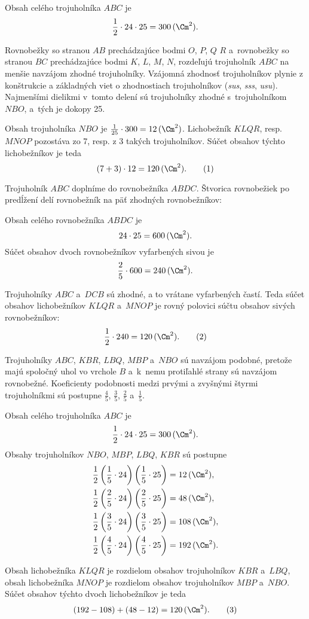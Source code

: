 {%
Obsah celého trojuholníka $ABC$ je
$$
\frac12\cdot24\cdot 25=300\,(\Cm^2).
$$

Rovnobežky so stranou $AB$ prechádzajúce bodmi $O$, $P$, $Q$ $R$ a~rovnobežky so stranou $BC$ prechádzajúce bodmi $K$, $L$, $M$, $N$, rozdeľujú trojuholník $ABC$ na menšie navzájom zhodné trojuholníky.
Vzájomná zhodnosť trojuholníkov plynie z konštrukcie a základných viet o zhodnostiach trojuholníkov ({\it sus\/}, {\it sss\/}, {\it usu\/}).
Najmenšími dielikmi v~tomto delení sú trojuholníky zhodné s~trojuholníkom $NBO$, a~tých je dokopy 25.
%

Obsah trojuholníka $NBO$ je $\frac1{25}\cdot300=12\,(\Cm^2)$.
Lichobežník $KLQR$, resp. $MNOP$ pozostáva zo 7, resp. z 3 takých trojuholníkov.
Súčet obsahov týchto lichobežníkov je teda
$$
(7+3)\cdot12 =120\,(\Cm^2) .  \tag{1}
$$

\ineriesenie
Trojuholník $ABC$ doplníme do rovnobežníka $ABDC$.
Štvorica rovnobežiek po predĺžení delí rovnobežník na päť zhodných rovnobežníkov:
%

Obsah celého rovnobežníka $ABDC$ je
$$
24\cdot25=600\,(\Cm^2).
$$
Súčet obsahov dvoch rovnobežníkov vyfarbených sivou je
$$
\frac25\cdot600 =240\,(\Cm^2).
$$

Trojuholníky $ABC$ a~$DCB$ sú zhodné, a to vrátane vyfarbených častí.
Teda súčet obsahov lichobežníkov $KLQR$ a~$MNOP$ je rovný polovici súčtu obsahov sivých rovnobežníkov:
$$
\frac12\cdot240 =120\,(\Cm^2) .  \tag{2}
$$

\ineriesenie
Trojuholníky $ABC$, $KBR$, $LBQ$, $MBP$ a~$NBO$ sú navzájom podobné, pretože majú spoločný uhol vo vrchole $B$ a~k~nemu protiľahlé strany sú navzájom rovnobežné.
Koeficienty podobnosti medzi prvými a zvyšnými štyrmi trojuholníkmi sú postupne $\frac45$, $\frac35$, $\frac25$ a~$\frac15$.
%

Obsah celého trojuholníka $ABC$ je
$$
\frac12\cdot24\cdot 25=300\,(\Cm^2).
$$
Obsahy trojuholníkov $NBO$, $MBP$, $LBQ$, $KBR$ sú postupne
$$\aligned
&\frac12\left(\frac15\cdot24\right)\left(\frac15\cdot25\right) =12\,(\Cm^2) , \\
&\frac12\left(\frac25\cdot24\right)\left(\frac25\cdot25\right) =48\,(\Cm^2) , \\
&\frac12\left(\frac35\cdot24\right)\left(\frac35\cdot25\right) =108\,(\Cm^2) , \\
&\frac12\left(\frac45\cdot24\right)\left(\frac45\cdot25\right) =192\,(\Cm^2) .
\endaligned
$$

Obsah lichobežníka $KLQR$ je rozdielom obsahov trojuholníkov $KBR$ a~$LBQ$,
obsah lichobežníka $MNOP$ je rozdielom obsahov trojuholníkov $MBP$ a~$NBO$.
Súčet obsahov týchto dvoch lichobežníkov je teda
$$
(192-108) +(48-12) =120\,(\Cm^2) .   \tag{3}
$$

}
